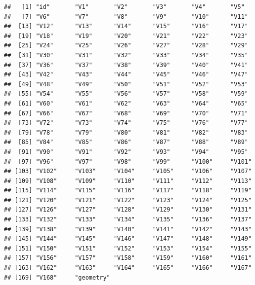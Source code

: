 \documentclass[12pt,graybox,envcountchap,sectrefs]{krantz}
\makeatletter
\newenvironment{Shaded}{\begin{snugshade}}{\end{snugshade}}
\newcommand{\OperatorTok}[1]{\textcolor[rgb]{0.81,0.36,0.00}{\textbf{#1}}}
\newcommand{\NormalTok}[1]{#1}
\newenvironment{kframe}{%
\medskip{}
\setlength{\fboxsep}{.8em}
 \def\at@end@of@kframe{}%
 \ifinner\ifhmode%
  \def\at@end@of@kframe{\end{minipage}}%
  \begin{minipage}{\columnwidth}%
 \fi\fi%
 \def\FrameCommand##1{\hskip\@totalleftmargin \hskip-\fboxsep
 \colorbox{shadecolor}{##1}\hskip-\fboxsep
     \hskip-\linewidth \hskip-\@totalleftmargin \hskip\columnwidth}%
 \MakeFramed {\advance\hsize-\width
   \@totalleftmargin\z@ \linewidth\hsize
   \@setminipage}}%
 {\par\unskip\endMakeFramed%
 \at@end@of@kframe}
\renewenvironment{Shaded}{\begin{kframe}}{\end{kframe}}
\theoremstyle{definition}
\theoremstyle{definition}
\theoremstyle{definition}
\theoremstyle{remark}
\makeatother
\begin{document}
\begin{verbatim}
##   [1] "id"       "V1"       "V2"       "V3"       "V4"       "V5"      
##   [7] "V6"       "V7"       "V8"       "V9"       "V10"      "V11"     
##  [13] "V12"      "V13"      "V14"      "V15"      "V16"      "V17"     
##  [19] "V18"      "V19"      "V20"      "V21"      "V22"      "V23"     
##  [25] "V24"      "V25"      "V26"      "V27"      "V28"      "V29"     
##  [31] "V30"      "V31"      "V32"      "V33"      "V34"      "V35"     
##  [37] "V36"      "V37"      "V38"      "V39"      "V40"      "V41"     
##  [43] "V42"      "V43"      "V44"      "V45"      "V46"      "V47"     
##  [49] "V48"      "V49"      "V50"      "V51"      "V52"      "V53"     
##  [55] "V54"      "V55"      "V56"      "V57"      "V58"      "V59"     
##  [61] "V60"      "V61"      "V62"      "V63"      "V64"      "V65"     
##  [67] "V66"      "V67"      "V68"      "V69"      "V70"      "V71"     
##  [73] "V72"      "V73"      "V74"      "V75"      "V76"      "V77"     
##  [79] "V78"      "V79"      "V80"      "V81"      "V82"      "V83"     
##  [85] "V84"      "V85"      "V86"      "V87"      "V88"      "V89"     
##  [91] "V90"      "V91"      "V92"      "V93"      "V94"      "V95"     
##  [97] "V96"      "V97"      "V98"      "V99"      "V100"     "V101"    
## [103] "V102"     "V103"     "V104"     "V105"     "V106"     "V107"    
## [109] "V108"     "V109"     "V110"     "V111"     "V112"     "V113"    
## [115] "V114"     "V115"     "V116"     "V117"     "V118"     "V119"    
## [121] "V120"     "V121"     "V122"     "V123"     "V124"     "V125"    
## [127] "V126"     "V127"     "V128"     "V129"     "V130"     "V131"    
## [133] "V132"     "V133"     "V134"     "V135"     "V136"     "V137"    
## [139] "V138"     "V139"     "V140"     "V141"     "V142"     "V143"    
## [145] "V144"     "V145"     "V146"     "V147"     "V148"     "V149"    
## [151] "V150"     "V151"     "V152"     "V153"     "V154"     "V155"    
## [157] "V156"     "V157"     "V158"     "V159"     "V160"     "V161"    
## [163] "V162"     "V163"     "V164"     "V165"     "V166"     "V167"    
## [169] "V168"     "geometry"
\end{verbatim}

\begin{Shaded}
\end{Shaded}
\end{document}
